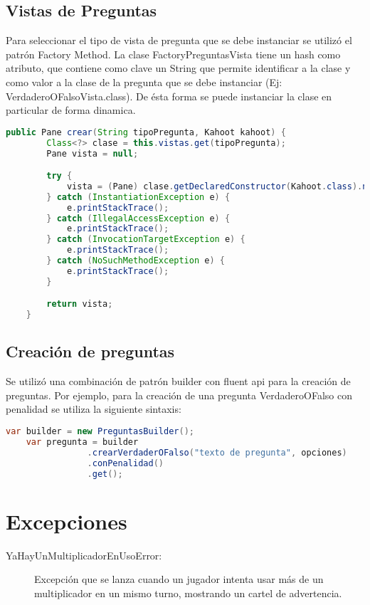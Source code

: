 \documentclass[titlepage,a4paper]{article}
\begin{document}
\subsection{Vistas de Preguntas} Para seleccionar el tipo de vista de pregunta que se debe instanciar se utilizó el patrón Factory Method. La clase FactoryPreguntasVista tiene un hash como atributo, que contiene como clave un String que permite identificar a la clase y como valor a la clase de la pregunta que se debe instanciar (Ej: VerdaderoOFalsoVista.class). De ésta forma se puede instanciar la clase en particular de forma dinamica.
\begin{lstlisting}[language=java]
    public Pane crear(String tipoPregunta, Kahoot kahoot) {
        Class<?> clase = this.vistas.get(tipoPregunta);
        Pane vista = null;

        try {
            vista = (Pane) clase.getDeclaredConstructor(Kahoot.class).newInstance(kahoot);
        } catch (InstantiationException e) {
            e.printStackTrace();
        } catch (IllegalAccessException e) {
            e.printStackTrace();
        } catch (InvocationTargetException e) {
            e.printStackTrace();
        } catch (NoSuchMethodException e) {
            e.printStackTrace();
        }

        return vista;
    }

\end{lstlisting}

\subsection{Creación de preguntas} Se utilizó una combinación de patrón builder con fluent api para la creación de preguntas. Por ejemplo, para la creación de una pregunta VerdaderoOFalso con penalidad se utiliza la siguiente sintaxis:
\begin{lstlisting}[language=java]
    var builder = new PreguntasBuilder();
    var pregunta = builder
                .crearVerdaderOFalso("texto de pregunta", opciones)
                .conPenalidad()
                .get();
\end{lstlisting}




\section{Excepciones}\label{sec:excepciones}

\begin{description}
\item[YaHayUnMultiplicadorEnUsoError:] Excepción que se lanza cuando un jugador intenta usar más de un multiplicador en un mismo turno, mostrando un cartel de advertencia.

\end{description}
\end{document}
